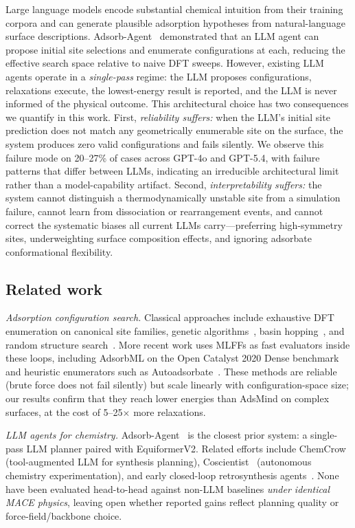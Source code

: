 Large language models encode substantial chemical intuition from their training corpora and can generate plausible adsorption hypotheses from natural-language surface descriptions.
Adsorb-Agent~\cite{ock2024adsorbagent} demonstrated that an LLM agent can propose initial site selections and enumerate configurations at each, reducing the effective search space relative to naive DFT sweeps.
However, existing LLM agents operate in a \textit{single-pass} regime: the LLM proposes configurations, relaxations execute, the lowest-energy result is reported, and the LLM is never informed of the physical outcome.
This architectural choice has two consequences we quantify in this work.
First, \textit{reliability suffers:} when the LLM's initial site prediction does not match any geometrically enumerable site on the surface, the system produces zero valid configurations and fails silently. We observe this failure mode on 20--27\% of cases across GPT-4o and GPT-5.4, with failure patterns that differ between LLMs, indicating an irreducible architectural limit rather than a model-capability artifact.
Second, \textit{interpretability suffers:} the system cannot distinguish a thermodynamically unstable site from a simulation failure, cannot learn from dissociation or rearrangement events, and cannot correct the systematic biases all current LLMs carry---preferring high-symmetry sites, underweighting surface composition effects, and ignoring adsorbate conformational flexibility.

\subsection{Related work}

\textit{Adsorption configuration search.}
Classical approaches include exhaustive DFT enumeration on canonical site families, genetic algorithms~\cite{vilhelmsen2014genetic}, basin hopping~\cite{wales1997global}, and random structure search~\cite{pickard2011ab}.
More recent work uses MLFFs as fast evaluators inside these loops, including AdsorbML on the Open Catalyst 2020 Dense benchmark~\cite{lan2023adsorbml} and heuristic enumerators such as Autoadsorbate~\cite{fako2025simple}.
These methods are reliable (brute force does not fail silently) but scale linearly with configuration-space size; our results confirm that they reach lower energies than AdsMind on complex surfaces, at the cost of 5--25$\times$ more relaxations.

\textit{LLM agents for chemistry.}
Adsorb-Agent~\cite{ock2024adsorbagent} is the closest prior system: a single-pass LLM planner paired with EquiformerV2.
Related efforts include ChemCrow~\cite{bran2024chemcrow} (tool-augmented LLM for synthesis planning), Coscientist~\cite{boiko2023autonomous} (autonomous chemistry experimentation), and early closed-loop retrosynthesis agents~\cite{schwaller2020predicting}.
None have been evaluated head-to-head against non-LLM baselines \textit{under identical MACE physics}, leaving open whether reported gains reflect planning quality or force-field/backbone choice.

